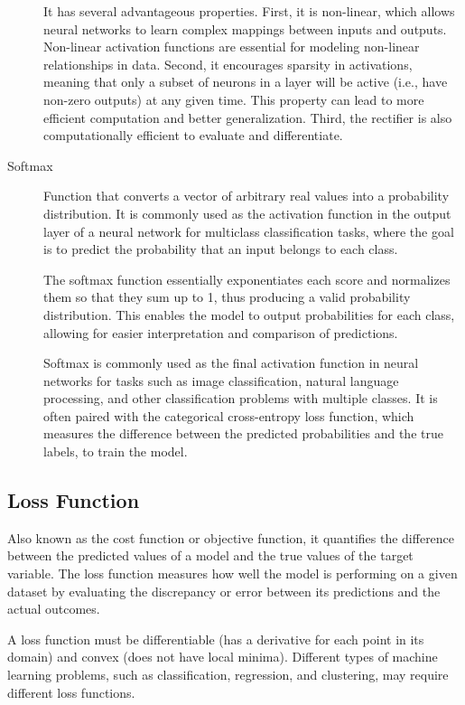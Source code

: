 \documentclass[a4paper]{article}
\begin{document}
\begin{description}
It has several advantageous properties. First, it is non-linear, which allows neural networks to learn complex mappings between inputs and outputs. Non-linear activation functions are essential for modeling non-linear relationships in data. Second, it encourages sparsity in activations, meaning that only a subset of neurons in a layer will be active (i.e., have non-zero outputs) at any given time. This property can lead to more efficient computation and better generalization. Third, the rectifier is also computationally efficient to evaluate and differentiate.

\item[Softmax]
Function that converts a vector of arbitrary real values into a probability distribution. It is commonly used as the activation function in the output layer of a neural network for multiclass classification tasks, where the goal is to predict the probability that an input belongs to each class.

The softmax function essentially exponentiates each score and normalizes them so that they sum up to 1, thus producing a valid probability distribution. This enables the model to output probabilities for each class, allowing for easier interpretation and comparison of predictions.

Softmax is commonly used as the final activation function in neural networks for tasks such as image classification, natural language processing, and other classification problems with multiple classes. It is often paired with the categorical cross-entropy loss function, which measures the difference between the predicted probabilities and the true labels, to train the model.

\end{description}


\subsection*{Loss Function}
Also known as the cost function or objective function, it quantifies the difference between the predicted values of a model and the true values of the target variable. The loss function measures how well the model is performing on a given dataset by evaluating the discrepancy or error between its predictions and the actual outcomes.

A loss function must be differentiable (has a derivative for each point in its domain) and convex (does not have local minima). Different types of machine learning problems, such as classification, regression, and clustering, may require different loss functions.
\end{document}
